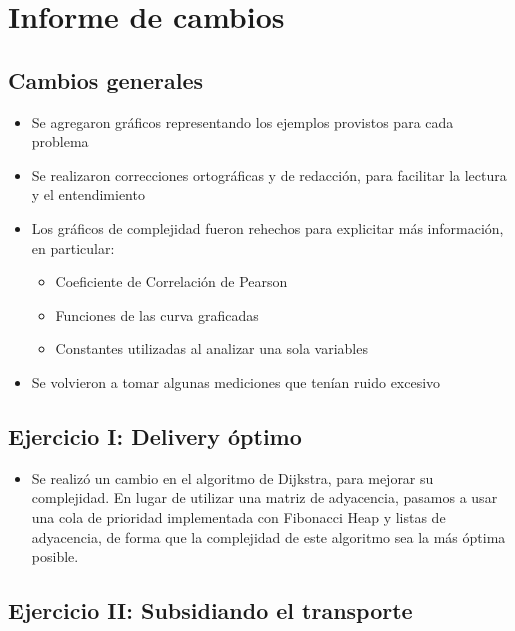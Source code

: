 \renewcommand\labelitemii{$\circ$}
\section{Informe de cambios}
	\subsection*{Cambios generales}

	\begin{itemize}
		\item Se agregaron gráficos representando los ejemplos provistos para cada problema
		
		\item Se realizaron correcciones ortográficas y de redacción, para facilitar la lectura y el entendimiento

		\item Los gráficos de complejidad fueron rehechos para explicitar más información, en particular:

		\begin{itemize}
			\item Coeficiente de Correlación de Pearson

			\item Funciones de las curva graficadas

			\item Constantes utilizadas al analizar una sola variables
		\end{itemize}

		\item Se volvieron a tomar algunas mediciones que tenían ruido excesivo
	\end{itemize}

	\subsection*{Ejercicio I: Delivery óptimo}

	\begin{itemize}
		\item Se realizó un cambio en el algoritmo de Dijkstra, para mejorar su complejidad. En lugar de utilizar una matriz de adyacencia, pasamos a usar una cola de prioridad implementada con Fibonacci Heap y listas de adyacencia, de forma que la complejidad de este algoritmo sea la más óptima posible.
		
	\end{itemize}

	\subsection*{Ejercicio II: Subsidiando el transporte}

